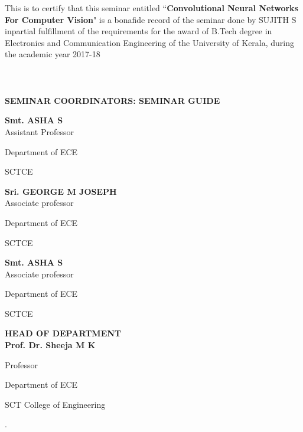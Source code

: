 \documentclass[12pt]{article}
\begin{document}
 \par This is to certify that this seminar entitled “\textbf{Convolutional Neural Networks For Computer Vision}" is a bonafide record of the seminar done by  SUJITH S inpartial fulfillment of the requirements for the award of B.Tech degree in Electronics and Communication Engineering of the University of Kerala,   during the  academic year 2017-18\\
 \\ \\ \\ \textbf{SEMINAR COORDINATORS: \hspace{55mm} SEMINAR GUIDE\\ \vspace{6mm}}

\begin{center}
\begin{multicols}{3}

    
\textbf{\small Smt. ASHA S}
\vspace{2mm}\\Assistant Professor

Department of ECE

SCTCE

\columnbreak %

\textbf{\small Sri. GEORGE M JOSEPH}
\vspace{2mm}\\Associate professor

Department of ECE 

SCTCE


\columnbreak

\textbf{\small Smt. ASHA S}
\vspace{2mm}\\Associate professor

Department of ECE

SCTCE

\end{multicols}
\vspace{20mm}

\textbf{\large HEAD OF DEPARTMENT}
\vspace{2mm}\\
\textbf{\small Prof. Dr. Sheeja M K}

Professor

Department of ECE

SCT College of Engineering
\end{center}
\newpage
{}
.
\vspace{25mm}
\end{document}
